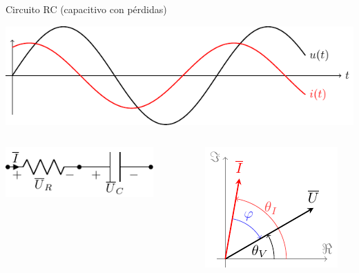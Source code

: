 \documentclass[aspectratio=169, usenames,svgnames,dvipsnames]{beamer}
\begin{document}
\begin{frame}[label={sec:org5f56126}]{Circuito RC (capacitivo con pérdidas)}
\begin{center}
\includegraphics[height=0.25\textheight]{../figs/capacitivo.pdf}
\end{center}


\begin{columns}
\begin{column}{0.45\columnwidth}
\begin{center}
\includegraphics[width=0.8\textwidth]{../figs/RC.pdf}
\end{center}
\end{column}

\begin{column}{0.55\columnwidth}
\begin{center}
\includegraphics[height=0.45\textheight]{../figs/fasorCondensadorReal_VI.pdf}
\end{center}
\end{column}
\end{columns}
\end{frame}
\end{document}
